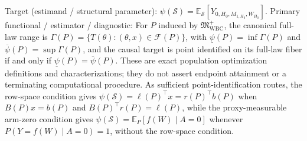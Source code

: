 \documentclass{article}
\begin{document}
Target (estimand / structural parameter): \(\psi(\mathcal S)=\mathbb E_{\mathcal S}[Y_{0,H_0,M_{1,H_0},W_{H_0}}]\).
Primary functional / estimator / diagnostic: For \(P\) induced by \(\mathfrak M_{\mathrm{WBC}}^{+}\), the canonical full-law range is \(\Gamma(P)=\{T(\theta):(\theta,x)\in\mathcal F(P)\}\), with \(\underline\psi(P)=\inf\Gamma(P)\) and \(\overline\psi(P)=\sup\Gamma(P)\), and the causal target is point identified on its full-law fiber if and only if \(\underline\psi(P)=\overline\psi(P)\). These are exact population optimization definitions and characterizations; they do not assert endpoint attainment or a terminating computational procedure. As sufficient point-identification routes, the row-space condition gives \(\psi(\mathcal S)=\ell(P)^{\top}x=r(P)^{\top}b(P)\) when \(B(P)x=b(P)\) and \(B(P)^{\top}r(P)=\ell(P)\), while the proxy-measurable arm-zero condition gives \(\psi(\mathcal S)=\mathbb E_P[f(W)\mid A=0]\) whenever \(P(Y=f(W)\mid A=0)=1\), without the row-space condition.
\end{document}
